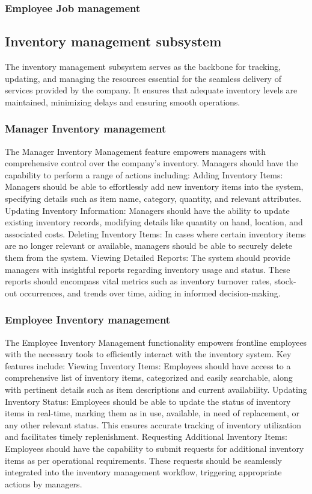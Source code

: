 \documentclass{article}
\begin{document}
	\subsubsection*{Employee Job management}	
	\subsection*{Inventory management subsystem}
	The inventory management subsystem serves as the backbone for tracking, updating, and managing the resources essential for the seamless delivery of services provided by the company. It ensures that adequate inventory levels are maintained, minimizing delays and ensuring smooth operations.

	\subsubsection*{Manager Inventory management}	
	The Manager Inventory Management feature empowers managers with comprehensive control over the company's inventory. Managers should have the capability to perform a range of actions including:
	Adding Inventory Items: Managers should be able to effortlessly add new inventory items into the system, specifying details such as item name, category, quantity, and relevant attributes.
	Updating Inventory Information: Managers should have the ability to update existing inventory records, modifying details like quantity on hand, location, and associated costs.
	Deleting Inventory Items: In cases where certain inventory items are no longer relevant or available, managers should be able to securely delete them from the system.
	Viewing Detailed Reports: The system should provide managers with insightful reports regarding inventory usage and status. These reports should encompass vital metrics such as inventory turnover rates, stock-out occurrences, and trends over time, aiding in informed decision-making.
	\subsubsection*{Employee Inventory management}	
	The Employee Inventory Management functionality empowers frontline employees with the necessary tools to efficiently interact with the inventory system. Key features include:
	Viewing Inventory Items: Employees should have access to a comprehensive list of inventory items, categorized and easily searchable, along with pertinent details such as item descriptions and current availability.
	Updating Inventory Status: Employees should be able to update the status of inventory items in real-time, marking them as in use, available, in need of replacement, or any other relevant status. This ensures accurate tracking of inventory utilization and facilitates timely replenishment.
	Requesting Additional Inventory Items: Employees should have the capability to submit requests for additional inventory items as per operational requirements. These requests should be seamlessly integrated into the inventory management workflow, triggering appropriate actions by managers.
\end{document}
